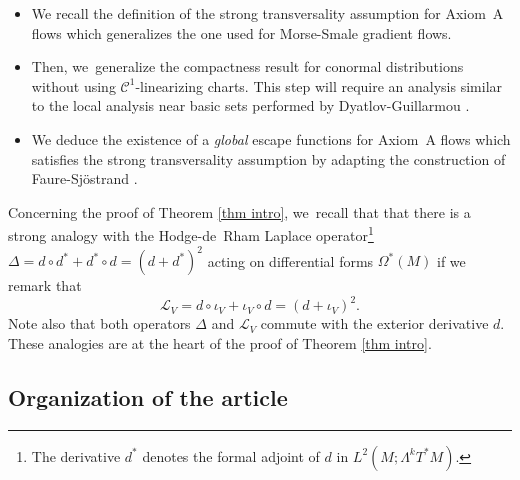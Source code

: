 \documentclass[11pt]{article}
\newcommand{\Subsection}{\subsection}
\theoremstyle{definition}
\theoremstyle{plain}
\newcommand{\Ccal}{\mathcal{C}}
\newcommand{\Lie}{\mathcal{L}}
\begin{document}
\begin{itemize}
\item We recall the definition of the strong transversality assumption for Axiom~A flows which generalizes the one used for Morse-Smale gradient flows.
\item Then, we~generalize the compactness result for conormal distributions without using $\Ccal^1$-linearizing charts. This step will require an analysis similar to the local analysis near basic sets performed by Dyatlov-Guillarmou \cite{dyatlov-guillarmou_2016}.
\item We deduce the existence of a \emph{global} escape functions for Axiom~A flows which satisfies the strong transversality assumption by adapting the construction of Faure-Sjöstrand \cite{FS}.
\end{itemize}

Concerning the proof of Theorem \ref{thm intro}, we~recall that that there is a strong analogy with the Hodge-de~Rham Laplace operator\footnote{The derivative $d^*$ denotes the formal adjoint of $d$ in $L^2 (M; \Lambda^k T^* M)$.} $\Delta = d \circ d^* + d^* \circ d = (d + d^*)^2$ acting on differential forms $\Omega^* (M)$ if we remark that
\[
\Lie_V = d\circ \iota_V + \iota_V \circ d = (d + \iota_V)^2.
\]
Note also that both operators $\Delta$ and $\Lie_V$ commute with the exterior derivative $d$. These analogies are at the heart of the proof of Theorem \ref{thm intro}.

\Subsection{Organization of the article}
\end{document}
